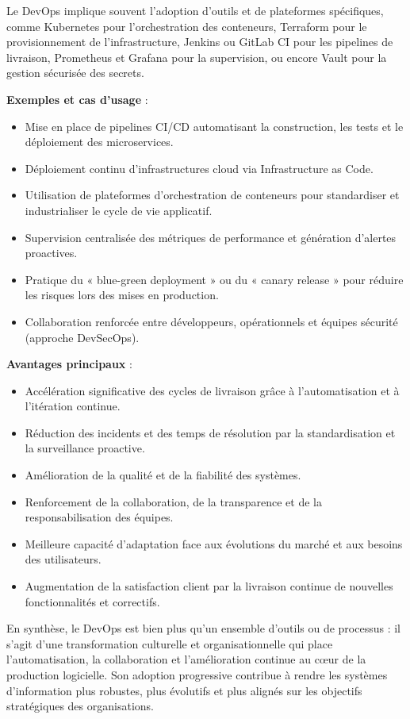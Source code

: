 Le DevOps implique souvent l’adoption d’outils et de plateformes spécifiques, comme Kubernetes pour l’orchestration des conteneurs, Terraform pour le provisionnement de l’infrastructure, Jenkins ou GitLab CI pour les pipelines de livraison, Prometheus et Grafana pour la supervision, ou encore Vault pour la gestion sécurisée des secrets.

\textbf{Exemples et cas d’usage} :
\begin{itemize}
	\item Mise en place de pipelines CI/CD automatisant la construction, les tests et le déploiement des microservices.
	\item Déploiement continu d’infrastructures cloud via Infrastructure as Code.
	\item Utilisation de plateformes d’orchestration de conteneurs pour standardiser et industrialiser le cycle de vie applicatif.
	\item Supervision centralisée des métriques de performance et génération d’alertes proactives.
	\item Pratique du « blue-green deployment » ou du « canary release » pour réduire les risques lors des mises en production.
	\item Collaboration renforcée entre développeurs, opérationnels et équipes sécurité (approche DevSecOps).
\end{itemize}

\textbf{Avantages principaux} :
\begin{itemize}
	\item Accélération significative des cycles de livraison grâce à l’automatisation et à l’itération continue.
	\item Réduction des incidents et des temps de résolution par la standardisation et la surveillance proactive.
	\item Amélioration de la qualité et de la fiabilité des systèmes.
	\item Renforcement de la collaboration, de la transparence et de la responsabilisation des équipes.
	\item Meilleure capacité d’adaptation face aux évolutions du marché et aux besoins des utilisateurs.
	\item Augmentation de la satisfaction client par la livraison continue de nouvelles fonctionnalités et correctifs.
\end{itemize}

En synthèse, le DevOps est bien plus qu’un ensemble d’outils ou de processus : il s’agit d’une transformation culturelle et organisationnelle qui place l’automatisation, la collaboration et l’amélioration continue au cœur de la production logicielle. Son adoption progressive contribue à rendre les systèmes d’information plus robustes, plus évolutifs et plus alignés sur les objectifs stratégiques des organisations.


